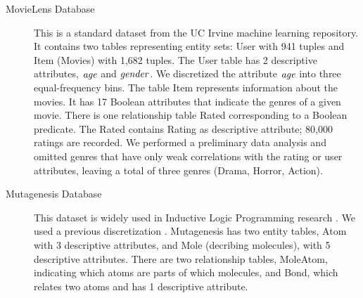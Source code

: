 \documentclass[twoside,11pt]{article}
\begin{document}
\begin{description}

\item[MovieLens Database] This is a standard dataset from the UC Irvine machine learning repository. 
It contains two tables representing entity sets: User with 941 tuples and Item (Movies) with 1,682 tuples.
The User table has 2 descriptive attributes, $\mathit{age}$ and $\it{gender}$. We discretized the attribute $\mathit{age}$ into three equal-frequency bins. The table Item represents information about the movies. It has 17 Boolean attributes that indicate the genres of a given movie. There is one relationship table Rated corresponding to a Boolean predicate. The Rated contains Rating as descriptive attribute; 80,000 ratings are recorded.  We performed a preliminary data analysis and omitted genres that have only weak correlations with the rating or user attributes, leaving a total of three genres (Drama, Horror, Action).
%

\item[Mutagenesis Database] This dataset is widely used in Inductive Logic Programming research \cite{Srinivasan1996}. %
We used a previous discretization \cite{Schulte2012}.
Mutagenesis has two entity tables, Atom with 3 descriptive attributes, and Mole (decribing molecules), with 5 descriptive attributes. 
There are two relationship tables, MoleAtom, indicating which atoms are parts of which molecules, and Bond, which relates two atoms and has 1 descriptive attribute. 


\end{description}
\end{document}
